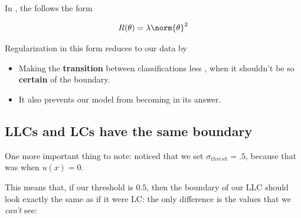         \begin{concept}
            In , the  follows the form
            
            \begin{equation*}
                R(\theta)=\lambda \norm{\theta}^2
            \end{equation*}
            
            Regularization in this form reduces  to our data by
            \begin{itemize}
                \item Making the \textbf{transition} between classifications less , when it shouldn't be so \textbf{certain} of the boundary.
                \item It also prevents our model from becoming  in its answer.
            \end{itemize} 
        \end{concept}
        
        
        
        
    \subsection{LLCs and LCs have the same boundary}
        
        One more important thing to note: noticed that we set $\sigma_{thresh}=.5$, because that was when $u(x)=0$.
        
        This means that, if our threshold is $0.5$, then the boundary of our LLC should look exactly the same as if it were LC: the only difference is the values that we \textit{can't} see:
        
